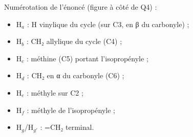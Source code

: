 \documentclass[11pt,a4paper]{article}
\providecommand{\tightlist}{\setlength{\itemsep}{0pt}\setlength{\parskip}{0pt}}
\begin{document}
Numérotation de l'énoncé (figure à côté de Q4) :

\begin{itemize}
\tightlist
\item
  H\(_a\) : H vinylique du cycle (sur C3, en β du carbonyle) ;
\item
  H\(_b\) : CH₂ allylique du cycle (C4) ;
\item
  H\(_c\) : méthine (C5) portant l'isopropényle ;
\item
  H\(_d\) : CH₂ en α du carbonyle (C6) ;
\item
  H\(_e\) : méthyle sur C2 ;
\item
  H\(_f\) : méthyle de l'isopropényle ;
\item
  H\(_g\)/H\(_{g'}\) : =CH₂ terminal.
\end{itemize}
\end{document}
